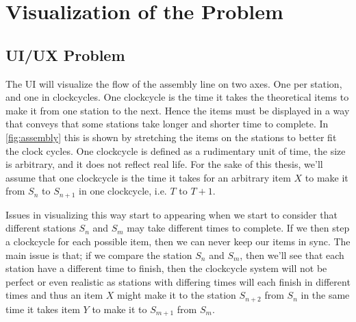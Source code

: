 \documentclass[12pt,a4paper]{report}
\begin{document}
\section{Visualization of the Problem}
\subsection{UI/UX Problem}
    The UI will visualize the flow of the assembly line on two axes. One per station, and one in clockcycles. One clockcycle is the time it takes the theoretical items to make it from one station to the next. Hence the items must be displayed in a way that conveys that some stations take longer and shorter time to complete. In \autoref{fig:assembly} this is shown by stretching the items on the stations to better fit the clock cycles. One clockcycle is defined as a rudimentary unit of time, the size is arbitrary, and it does not reflect real life. For the sake of this thesis, we'll assume that one clockcycle is the time it takes for an arbitrary item $X$ to make it from $S_n$ to $S_{n+1}$ in one clockcycle, i.e. $T$ to $T + 1$.

    Issues in visualizing this way start to appearing when we start to consider that different stations $S_n$ and $S_m$ may take different times to complete. If we then step a clockcycle for each possible item, then we can never keep our items in sync. The main issue is that; if we compare the station $S_n$ and $S_m$, then we'll see that each station have a different time to finish, then the clockcycle system will not be perfect or even realistic as stations with differing times will each finish in different times and thus an item $X$ might make it to the station $S_{n+2}$
from $S_n$ in the same time it takes item $Y$ to make it to $S_{m+1}$ from $S_{m}$.
\end{document}
